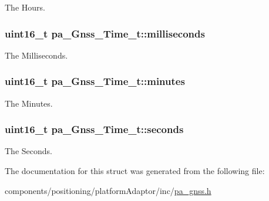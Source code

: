 The Hours. 

\subsubsection[{\texorpdfstring{milliseconds}{milliseconds}}]{\setlength{\rightskip}{0pt plus 5cm}uint16\+\_\+t pa\+\_\+\+Gnss\+\_\+\+Time\+\_\+t\+::milliseconds}\hypertarget{structpa___gnss___time__t_a9f329755804481b7516a8fc4048d47be}{}\label{structpa___gnss___time__t_a9f329755804481b7516a8fc4048d47be}


The Milliseconds. 

\subsubsection[{\texorpdfstring{minutes}{minutes}}]{\setlength{\rightskip}{0pt plus 5cm}uint16\+\_\+t pa\+\_\+\+Gnss\+\_\+\+Time\+\_\+t\+::minutes}\hypertarget{structpa___gnss___time__t_aa471c8d3b7d70143abf41396e9beda2e}{}\label{structpa___gnss___time__t_aa471c8d3b7d70143abf41396e9beda2e}


The Minutes. 

\subsubsection[{\texorpdfstring{seconds}{seconds}}]{\setlength{\rightskip}{0pt plus 5cm}uint16\+\_\+t pa\+\_\+\+Gnss\+\_\+\+Time\+\_\+t\+::seconds}\hypertarget{structpa___gnss___time__t_ab72e58e36b2c6d227ed24c03937e1cfc}{}\label{structpa___gnss___time__t_ab72e58e36b2c6d227ed24c03937e1cfc}


The Seconds. 



The documentation for this struct was generated from the following file\+:\begin{DoxyCompactItemize}
\item 
components/positioning/platform\+Adaptor/inc/\hyperlink{pa__gnss_8h}{pa\+\_\+gnss.\+h}\end{DoxyCompactItemize}
